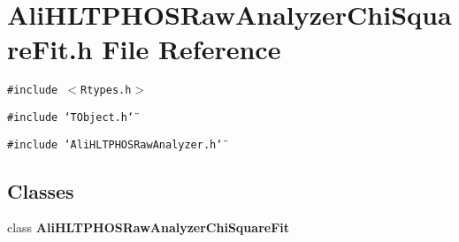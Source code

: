 \section{Ali\-HLTPHOSRaw\-Analyzer\-Chi\-Square\-Fit.h File Reference}
\label{AliHLTPHOSRawAnalyzerChiSquareFit_8h}
{\tt \#include $<$Rtypes.h$>$}\par
{\tt \#include \char`\"{}TObject.h\char`\"{}}\par
{\tt \#include \char`\"{}Ali\-HLTPHOSRaw\-Analyzer.h\char`\"{}}\par
\subsection*{Classes}
\begin{CompactItemize}
\item 
class {\bf Ali\-HLTPHOSRaw\-Analyzer\-Chi\-Square\-Fit}
\end{CompactItemize}
